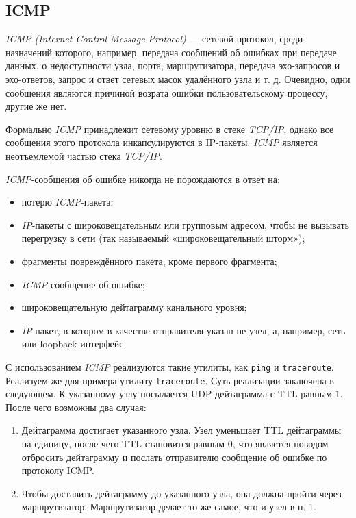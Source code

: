\subsection{ICMP}
\emph{ICMP (Internet Control Message Protocol)} — сетевой протокол, среди назначений которого, например, передача сообщений об ошибках при передаче данных, о недоступности узла, порта, маршрутизатора, передача эхо-запросов и эхо-ответов, запрос и ответ сетевых масок удалённого узла и т. д. Очевидно, одни сообщения являются причиной возрата ошибки пользовательскому процессу, другие же нет.

Формально \emph{ICMP} принадлежит сетевому уровню в стеке \emph{TCP/IP}, однако все сообщения этого протокола инкапсулируются в IP-пакеты. \emph{ICMP} является неотъемлемой частью стека \emph{TCP/IP}.

\emph{ICMP}-сообщения об ошибке никогда не порождаются в ответ на:
\begin{itemize}
  \item потерю \emph{ICMP}-пакета;
  \item \emph{IP}-пакеты с широковещательным или групповым адресом, чтобы не вызывать перегрузку в сети (так называемый «широковещательный шторм»);
  \item фрагменты повреждённого пакета, кроме первого фрагмента;
  \item \emph{ICMP}-сообщение об ошибке;
  \item широковещательную дейтаграмму канального уровня;
  \item \emph{IP}-пакет, в котором в качестве отправителя указан не узел, а, например, сеть или loopback-интерфейс.
\end{itemize}

С использованием \emph{ICMP} реализуются такие утилиты, как \lstinline{ping} и \lstinline{traceroute}. Реализуем же для примера утилиту \lstinline{traceroute}. Суть реализации заключена в следующем. К указанному узлу посылается UDP-дейтаграмма с TTL равным $1$. После чего возможны два случая:
\begin{enumerate}
  \item Дейтаграмма достигает указанного узла. Узел уменьшает TTL дейтаграммы на единицу, после чего TTL становится равным $0$, что является поводом отбросить дейтаграмму и послать отправителю сообщение об ошибке по протоколу ICMP.
  \item Чтобы доставить дейтаграмму до указанного узла, она должна пройти через маршрутизатор. Маршрутизатор делает то же самое, что и узел в п. 1.
\end{enumerate}

